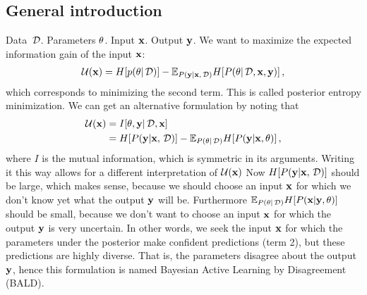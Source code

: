 
\subsection*{General introduction} %
\label{sub:general_introduction}
Data $\,\mathcal{D}$. Parameters $\theta$. Input ${\bf x}$. Output ${\bf y}$.
We want to maximize the expected information gain of the input ${\bf x}$:
\begin{align}
	\mathcal{U}({\bf x})
	= H[p(\theta | \,\mathcal{D})]
	- \mathbb{E}_{{P({\bf y} | {\bf x}, \,\mathcal{D})}} H[{P(\theta | \,\mathcal{D}, {\bf x}, {\bf y})}] \,,
\end{align}
which corresponds to minimizing the second term. This is called posterior entropy minimization.
We can get an alternative formulation by noting that
\begin{align}
	\mathcal{U}({\bf x})
	&= I[\theta, {\bf y} | \,\mathcal{D}, {\bf x}] \\
	&= H[{P({\bf y} | {\bf x}, \,\mathcal{D})}]
	- \mathbb{E}_{{P(\theta | \,\mathcal{D})}} H[{P({\bf y} | {\bf x}, \theta)}] \,,
\end{align}
where $I$ is the mutual information, which is symmetric in its arguments. Writing it this way allows for a different interpretation of $\mathcal{U}({\bf x})$
Now $H[{P({\bf y} | {\bf x}, \,\mathcal{D})}]$ should be large, which makes sense, because we should choose an input ${\bf x}$ for which we don't know yet what the output ${\bf y}$ will be. Furthermore $\mathbb{E}_{{P(\theta | \,\mathcal{D})}} H[{P({\bf x} | {\bf y}, \theta)}]$ should be small, because we don't want to choose an input ${\bf x}$ for which the output ${\bf y}$ is very uncertain.
In other words, we seek the input ${\bf x}$ for which the parameters under the posterior make confident predictions (term 2), but these predictions are highly diverse. That is, the parameters disagree about the output ${\bf y}$, hence this formulation is named Bayesian Active Learning by Disagreement (BALD).



